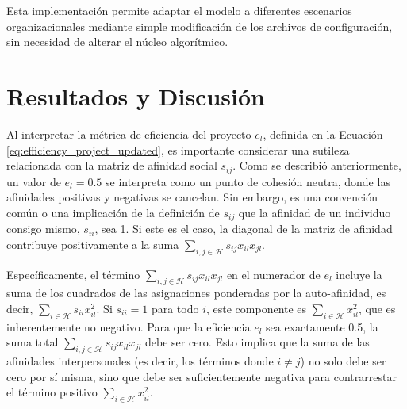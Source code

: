 \documentclass[conference]{IEEEtran}
\begin{document}
Esta implementación permite adaptar el modelo a diferentes escenarios organizacionales mediante simple modificación de los archivos de configuración, sin necesidad de alterar el núcleo algorítmico.

\section{Resultados y Discusión}

Al interpretar la métrica de eficiencia del proyecto $e_l$, definida en la Ecuación \ref{eq:efficiency_project_updated}, es importante considerar una sutileza relacionada con la matriz de afinidad social $s_{ij}$. Como se describió anteriormente, un valor de $e_l=0.5$ se interpreta como un punto de cohesión neutra, donde las afinidades positivas y negativas se cancelan. Sin embargo, es una convención común o una implicación de la definición de $s_{ij}$ que la afinidad de un individuo consigo mismo, $s_{ii}$, sea 1. Si este es el caso, la diagonal de la matriz de afinidad contribuye positivamente a la suma $\sum_{i,j \in \mathcal{H}} s_{ij} x_{il} x_{jl}$.

Específicamente, el término $\sum_{i,j \in \mathcal{H}} s_{ij} x_{il} x_{jl}$ en el numerador de $e_l$ incluye la suma de los cuadrados de las asignaciones ponderadas por la auto-afinidad, es decir, $\sum_{i \in \mathcal{H}} s_{ii} x_{il}^2$. Si $s_{ii}=1$ para todo $i$, este componente es $\sum_{i \in \mathcal{H}} x_{il}^2$, que es inherentemente no negativo. Para que la eficiencia $e_l$ sea exactamente 0.5, la suma total $\sum_{i,j \in \mathcal{H}} s_{ij} x_{il} x_{jl}$ debe ser cero. Esto implica que la suma de las afinidades interpersonales (es decir, los términos donde $i \neq j$) no solo debe ser cero por sí misma, sino que debe ser suficientemente negativa para contrarrestar el término positivo $\sum_{i \in \mathcal{H}} x_{il}^2$.
\end{document}
